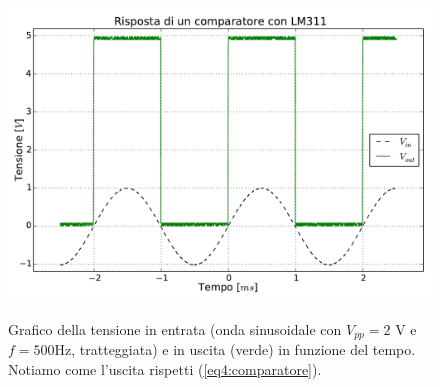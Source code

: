 \begin{figure}[ht]
 \centering
   {\includegraphics[width=14.5cm]{../E04/latex/comp.pdf}}
 \caption{Grafico della tensione in entrata (onda sinusoidale con $V_{pp}=2$ \si{\volt} e $f=500$\si{\hertz}, tratteggiata) e in uscita (verde) in funzione del tempo. Notiamo come l'uscita rispetti (\ref{eq4:comparatore}).}
 \label{gr4:comparatore}
\end{figure}